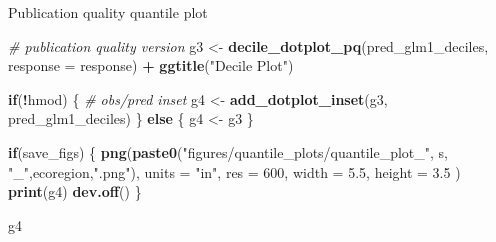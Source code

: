 \documentclass[
]{article}
\newenvironment{Shaded}{\begin{snugshade}}{\end{snugshade}}
\newcommand{\AttributeTok}[1]{\textcolor[rgb]{0.13,0.29,0.53}{#1}}
\newcommand{\CommentTok}[1]{\textcolor[rgb]{0.56,0.35,0.01}{\textit{#1}}}
\newcommand{\ConstantTok}[1]{\textcolor[rgb]{0.56,0.35,0.01}{#1}}
\newcommand{\ControlFlowTok}[1]{\textcolor[rgb]{0.13,0.29,0.53}{\textbf{#1}}}
\newcommand{\DecValTok}[1]{\textcolor[rgb]{0.00,0.00,0.81}{#1}}
\newcommand{\FloatTok}[1]{\textcolor[rgb]{0.00,0.00,0.81}{#1}}
\newcommand{\FunctionTok}[1]{\textcolor[rgb]{0.13,0.29,0.53}{\textbf{#1}}}
\newcommand{\NormalTok}[1]{#1}
\newcommand{\OtherTok}[1]{\textcolor[rgb]{0.56,0.35,0.01}{#1}}
\newcommand{\SpecialCharTok}[1]{\textcolor[rgb]{0.81,0.36,0.00}{\textbf{#1}}}
\newcommand{\StringTok}[1]{\textcolor[rgb]{0.31,0.60,0.02}{#1}}
\begin{document}
\begin{Shaded}
\end{Shaded}

Publication quality quantile plot

\begin{Shaded}
\begin{Highlighting}[]
\CommentTok{\# publication quality version}
\NormalTok{g3 }\OtherTok{\textless{}{-}} \FunctionTok{decile\_dotplot\_pq}\NormalTok{(pred\_glm1\_deciles, }\AttributeTok{response =}\NormalTok{ response) }\SpecialCharTok{+} \FunctionTok{ggtitle}\NormalTok{(}\StringTok{"Decile Plot"}\NormalTok{)}

\ControlFlowTok{if}\NormalTok{(}\SpecialCharTok{!}\NormalTok{hmod) \{}
\CommentTok{\# obs/pred inset}
\NormalTok{g4 }\OtherTok{\textless{}{-}} \FunctionTok{add\_dotplot\_inset}\NormalTok{(g3, pred\_glm1\_deciles)}
\NormalTok{\} }\ControlFlowTok{else}\NormalTok{ \{}
\NormalTok{  g4 }\OtherTok{\textless{}{-}}\NormalTok{ g3}
\NormalTok{\}}

  
\ControlFlowTok{if}\NormalTok{(save\_figs) \{}
  \FunctionTok{png}\NormalTok{(}\FunctionTok{paste0}\NormalTok{(}\StringTok{"figures/quantile\_plots/quantile\_plot\_"}\NormalTok{, s,  }\StringTok{"\_"}\NormalTok{,ecoregion,}\StringTok{".png"}\NormalTok{), }
     \AttributeTok{units =} \StringTok{"in"}\NormalTok{, }\AttributeTok{res =} \DecValTok{600}\NormalTok{, }\AttributeTok{width =} \FloatTok{5.5}\NormalTok{, }\AttributeTok{height =} \FloatTok{3.5}\NormalTok{ )}
    \FunctionTok{print}\NormalTok{(g4)}
  \FunctionTok{dev.off}\NormalTok{()}
\NormalTok{\}}

\NormalTok{g4}
\end{Highlighting}
\end{Shaded}
\end{document}
